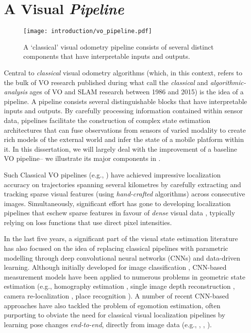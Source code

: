 \section{A Visual \textit{Pipeline}}

\begin{figure}
\begin{center}
		\texttt{[image: introduction/vo\_pipeline.pdf]}
		\caption{A `classical' visual odometry pipeline consists of several distinct components that have interpretable inputs and outputs.}
  	\label{fig:intro_vo_pipeline}
\end{center}
\end{figure}


Central to \textit{classical} visual odometry algorithms (which, in this context, refers to the bulk of VO research published during what \cite{Cadena2016-ds} call the \textit{classical} and \textit{algorithmic-analysis} ages of VO and SLAM research between 1986 and 2015) is the idea of a pipeline. A pipeline consists several distinguishable blocks that have interpretable inputs and outputs.  By carefully processing information contained within sensor data, pipelines facilitate the construction of complex state estimation architectures that can fuse observations from sensors of varied modality to create rich models of the external world and infer the state of a mobile platform within it. In this dissertation, we will largely deal with the improvement of a baseline VO pipeline-- we illustrate its major components in . 

Such Classical VO pipelines (e.g., \cite{Leutenegger2015-fk, Cvisic2015-mt, Tsotsos2015}) have achieved impressive localization accuracy on trajectories spanning several kilometres by carefully extracting and tracking sparse visual features (using \textit{hand-crafted} algorithms) across consecutive images. Simultaneously, significant effort has gone to developing localization pipelines that eschew sparse features in favour of \textit{dense} visual data \citep{Alcantarilla2016-kv, forster2014svo}, typically relying on loss functions that use direct pixel intensities. 

In the last five years, a significant part of the visual state estimation literature has also focused on the idea of replacing classical pipelines with parametric modelling through deep convolutional neural networks (CNNs) and data-driven learning. Although initially developed for image classification  \citep{LeCun2015-qf}, CNN-based measurement models have been applied to numerous problems in geometric state estimation (e.g., homography estimation \citep{DeTone2016-ue}, single image depth reconstruction \citep{Garg2016-ip},  camera re-localization \citep{Kendall2016-zf}, place recognition \citep{Sunderhauf2015-is}). A number of recent CNN-based approaches have also tackled the problem of egomotion estimation, often purporting to obviate the need for classical visual localization pipelines by learning pose changes \textit{end-to-end}, directly from image data (e.g., \cite{Melekhov2017-dl}, \cite{Handa2016-hm}, \cite{Oliveira2017-lt}).

